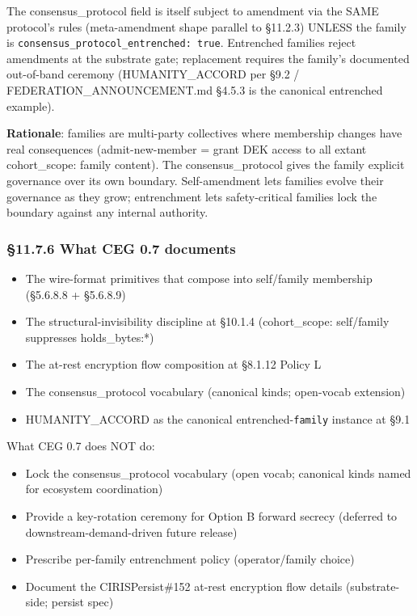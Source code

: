 \documentclass[10pt]{article}
\begin{document}
The consensus\_protocol field is itself subject to amendment via the SAME protocol's rules (meta-amendment shape parallel to §11.2.3) UNLESS the family is \texttt{consensus\_protocol\_entrenched: true}. Entrenched families reject amendments at the substrate gate; replacement requires the family's documented out-of-band ceremony (HUMANITY\_ACCORD per §9.2 / FEDERATION\_ANNOUNCEMENT.md §4.5.3 is the canonical entrenched example).


\textbf{Rationale}: families are multi-party collectives where membership changes have real consequences (admit-new-member = grant DEK access to all extant cohort\_scope: family content). The consensus\_protocol gives the family explicit governance over its own boundary. Self-amendment lets families evolve their governance as they grow; entrenchment lets safety-critical families lock the boundary against any internal authority.


\subsubsection*{§11.7.6 What CEG 0.7 documents}


\begin{itemize}\setlength\itemsep{0pt}
\item The wire-format primitives that compose into self/family membership (§5.6.8.8 + §5.6.8.9)
\item The structural-invisibility discipline at §10.1.4 (cohort\_scope: self/family suppresses holds\_bytes:*)
\item The at-rest encryption flow composition at §8.1.12 Policy L
\item The consensus\_protocol vocabulary (canonical kinds; open-vocab extension)
\item HUMANITY\_ACCORD as the canonical entrenched-\texttt{family} instance at §9.1
\end{itemize}


What CEG 0.7 does NOT do:

\begin{itemize}\setlength\itemsep{0pt}
\item Lock the consensus\_protocol vocabulary (open vocab; canonical kinds named for ecosystem coordination)
\item Provide a key-rotation ceremony for Option B forward secrecy (deferred to downstream-demand-driven future release)
\item Prescribe per-family entrenchment policy (operator/family choice)
\item Document the CIRISPersist\#152 at-rest encryption flow details (substrate-side; persist spec)
\end{itemize}
\end{document}
